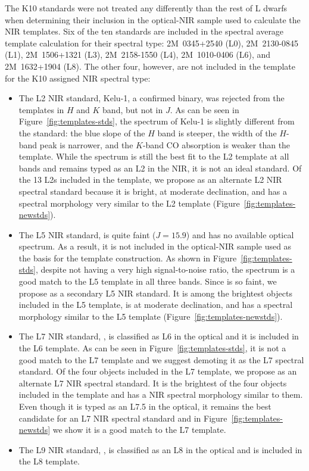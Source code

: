 \documentclass[12pt,preprint]{aastex}
\begin{document}
The K10 standards were not treated any differently than the rest of L dwarfs when determining their inclusion in the optical-NIR sample used to calculate the NIR templates. 
Six of the ten standards are included in the spectral average template calculation for their spectral type: 2M~0345+2540 (L0), 2M~2130-0845 (L1), 2M~1506+1321 (L3), 2M~2158-1550 (L4), 2M~1010-0406 (L6), and 2M~1632+1904 (L8).
The other four, however, are not included in the template for the K10 assigned NIR spectral type:
\begin{itemize}

	\item The L2 NIR standard,  Kelu-1, a confirmed binary, was rejected from the templates in $H$ and $K$ band, but not in $J$. As can be seen in Figure~\ref{fig:templates-stds}, the spectrum of Kelu-1 is slightly different from the standard: the blue slope of the $H$ band is steeper, the width of the $H$-band peak is narrower, and the $K$-band CO absorption is weaker than the template. While the spectrum is still the best fit to the L2 template at all bands and remains typed as an L2 in the NIR, it is not an ideal standard. Of the 13 L2s included in the template, we propose  as an alternate L2 NIR spectral standard because it is bright, at moderate declination, and has a spectral morphology very similar to the L2 template (Figure~\ref{fig:templates-newstds}).

	\item The L5 NIR standard,  is quite faint ($J=15.9$) and has no available optical spectrum. As a result, it is not included in the optical-NIR sample used as the basis for the template construction. As shown in Figure~\ref{fig:templates-stds}, despite not having a very high signal-to-noise ratio, the spectrum is a good match to the L5 template in all three bands. Since  is so faint, we propose  as a secondary L5 NIR standard. It is among the brightest objects included in the L5 template, is at moderate declination, and has a spectral morphology similar to the L5 template (Figure~\ref{fig:templates-newstds}). 

	\item The L7 NIR standard, , is classified as L6 in the optical \cite{K00} and it is included in the L6 template. 
	As can be seen in Figure~\ref{fig:templates-stds}, it is not a good match to the L7 template and we suggest demoting it as the L7 spectral standard. 
	Of the four objects included in the L7 template, we propose  as an alternate L7 NIR spectral standard. 
	It is the brightest of the four objects included in the template and has a NIR spectral morphology similar to them. 
	Even though it is typed as an L7.5 in the optical, it remains the best candidate for an L7 NIR spectral standard and in Figure~\ref{fig:templates-newstds} we show it is a good match to the L7 template.	
		
	\item The L9 NIR standard, , is classified as an L8 in the optical and is included in the L8 template. 
	
\end{itemize}
\end{document}
